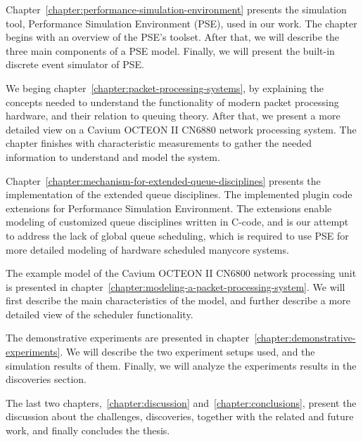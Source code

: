 Chapter~\ref{chapter:performance-simulation-environment} presents the simulation tool, Performance Simulation Environment (PSE), used in our work. The chapter begins with an overview of the PSE's toolset. After that, we will describe the three main components of a PSE model. Finally, we will present the built-in discrete event simulator of PSE.

We beging chapter~\ref{chapter:packet-processing-systems}, by explaining the concepts needed to understand the functionality of modern packet processing hardware, and their relation to queuing theory. After that, we present a more detailed view on a Cavium OCTEON II CN6880 network processing system. The chapter finishes with characteristic measurements to gather the needed information to understand and model the system.

Chapter~\ref{chapter:mechanism-for-extended-queue-disciplines} presents the implementation of the extended queue disciplines. The implemented plugin code extensions for Performance Simulation Environment. The extensions enable modeling of customized queue disciplines written in C-code, and is our attempt to address the lack of global queue scheduling, which is required to use PSE for more detailed modeling of  hardware scheduled manycore systems.

The example model of the Cavium OCTEON II CN6800 network processing unit is presented in chapter~\ref{chapter:modeling-a-packet-processing-system}. We will first describe the main characteristics of the model, and further describe a more detailed view of the scheduler functionality.

The demonstrative experiments are presented in chapter~\ref{chapter:demonstrative-experiments}. We will describe the two experiment setups used, and the simulation results of them. Finally, we will analyze the experiments results in the discoveries section.

The last two chapters,~\ref{chapter:discussion} and~\ref{chapter:conclusions}, present the discussion about the challenges, discoveries, together with the related and future work, and finally concludes the thesis.

